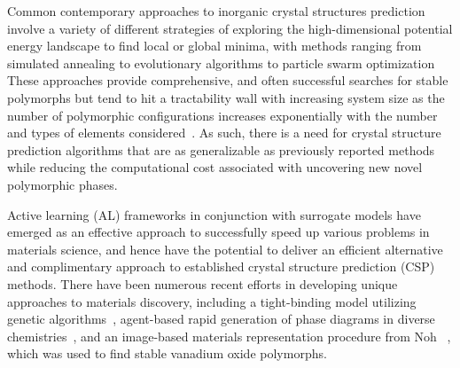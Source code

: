 %
%
%
Common contemporary approaches to inorganic crystal structures prediction involve a variety of different strategies of exploring the high-dimensional potential energy landscape to find local or global minima,
with methods ranging from simulated annealing to evolutionary algorithms to particle swarm optimization
\cite{Oganov2006,Lyakhov2010,Glass2006,Wang2012,Pickard2011,Pickard2006,Avery2019,Lonie2011}
%
These approaches provide comprehensive,
and often successful searches for stable polymorphs but tend to hit a tractability wall with increasing system size as the number of polymorphic configurations increases exponentially with the number and types of elements considered~\cite{Stillinger1999}.
%
As such, there is a need for crystal structure prediction algorithms that are as generalizable as previously reported methods while reducing the computational cost associated with uncovering new novel polymorphic phases.


%
%
Active learning (AL) frameworks in conjunction with surrogate models have emerged as an effective approach to successfully speed up various problems in materials science,
and hence have the potential to deliver an efficient alternative and complimentary approach to established crystal structure prediction (CSP) methods.
\cite{hansen2019atomistic,torres2019low,Jennings2019,podryabinkin2017active,Bassman2018}
%
There have been numerous recent efforts in developing unique approaches to materials discovery,
including a tight-binding model utilizing genetic algorithms~\cite{VanDenBossche2018},
agent-based rapid generation of phase diagrams in diverse chemistries~\cite{Montoya2020},
and an image-based materials representation procedure from Noh ~\cite{noh2019inverse},
which was used to find stable vanadium oxide polymorphs.


